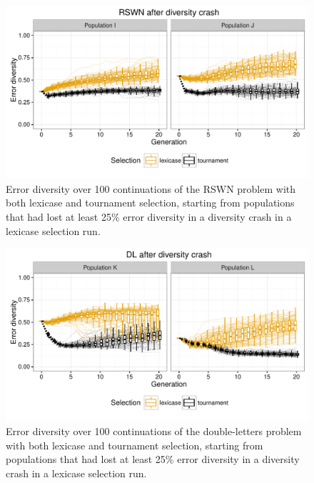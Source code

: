 \documentclass{sig-alternate-05-2015}
\begin{document}
\begin{figure}
	\includegraphics{../figures/RSWN_diversity_crash}
	\vspace{-1 cm}
	\caption{Error diversity over 100 continuations of the RSWN problem with both lexicase and tournament selection, starting from populations that had lost at least 25\% error diversity in a diversity crash in a lexicase selection run.}
	\label{fig:RSWNdiversityCrash}
\end{figure}

\begin{figure}
	\includegraphics{../figures/DL_diversity_crash}
	\vspace{-1 cm}
	\caption{Error diversity over 100 continuations of the double-letters problem with both lexicase and tournament selection, starting from populations that had lost at least 25\% error diversity in a diversity crash in a lexicase selection run.}
	\label{fig:DLdiversityCrash}
\end{figure}
\end{document}
